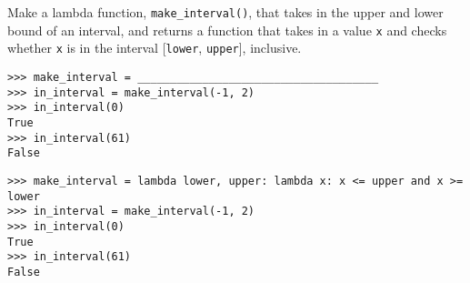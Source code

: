 \begin{blocksection}
\question Make a lambda function, \lstinline$make_interval()$, that takes in the upper and lower bound of an interval, and returns a function that takes in a value \lstinline$x$ and checks whether \lstinline$x$ is in the interval [\lstinline$lower$, \lstinline$upper$], inclusive.

\begin{lstlisting}
>>> make_interval = _____________________________________
>>> in_interval = make_interval(-1, 2)
>>> in_interval(0)
True
>>> in_interval(61)
False

\end{lstlisting}

\begin{solution}[1in]
\begin{lstlisting}
>>> make_interval = lambda lower, upper: lambda x: x <= upper and x >= lower
>>> in_interval = make_interval(-1, 2)
>>> in_interval(0)
True
>>> in_interval(61)
False

\end{lstlisting}
\end{solution}
\end{blocksection}